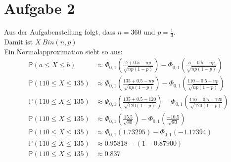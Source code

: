 \documentclass[a4paper,10pt]{article}
\title{}
\author{}
\newcommand{\Wk}[1]{\ensuremath{\mathbb{P}(#1)}}
\begin{document}
\maketitle



\section*{Aufgabe 2}
Aus der Aufgabenstellung folgt, dass $n = 360$ und $p = \frac{1}{3}$.\\
Damit ist $X ~ Bin(n,p)$ \\
Ein Normalapproximation sieht so aus:\\
\begin {align*}
\Wk{a \leq X \leq b} & \approx \Phi_{0,1}(\frac{b+0.5-np}{\sqrt{np(1-p)}}) -   \Phi_{0,1}(\frac{a-0.5-np}{\sqrt{np(1-p)}})  \\
\Wk{110 \leq X \leq 135} & \approx \Phi_{0,1}(\frac{135+0.5-np}{\sqrt{np(1-p)}}) -   \Phi_{0,1}(\frac{110-0.5-np}{\sqrt{np(1-p)}}) \\
\Wk{110 \leq X \leq 135} & \approx \Phi_{0,1}(\frac{135+0.5-120}{\sqrt{120(1-p)}}) -   \Phi_{0,1}(\frac{110-0.5-120}{\sqrt{120(1-p)}}) \\
\Wk{110 \leq X \leq 135} & \approx \Phi_{0,1}(\frac{15.5}{\sqrt{80}}) -   \Phi_{0,1}(\frac{-10.5}{\sqrt{80}}) \\
\Wk{110 \leq X \leq 135} & \approx \Phi_{0,1}(1.73295) - \Phi_{0,1}(-1.17394) \\
\Wk{110 \leq X \leq 135} & \approx 0.95818 -(1-0.87900) \\
\Wk{110 \leq X \leq 135} & \approx 0.837
\end {align*}
\end{document}
